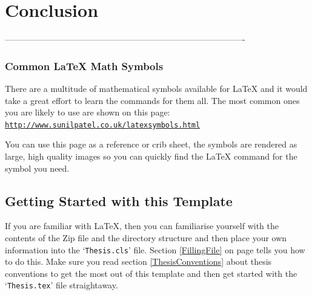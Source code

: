 
\chapter{Conclusion} %

\label{Chapter4} %



-------------------------------------------------------------------------------------




\subsection{Common \LaTeX{} Math Symbols}
There are a multitude of mathematical symbols available for \LaTeX{} and it would take a great effort to learn the commands for them all. The most common ones you are likely to use are shown on this page:\\
\href{http://www.sunilpatel.co.uk/latexsymbols.html}{\texttt{http://www.sunilpatel.co.uk/latexsymbols.html}}

You can use this page as a reference or crib sheet, the symbols are rendered as large, high quality images so you can quickly find the \LaTeX{} command for the symbol you need.




\section{Getting Started with this Template}

If you are familiar with \LaTeX{}, then you can familiarise yourself with the contents of the Zip file and the directory structure and then place your own information into the `\texttt{Thesis.cls}' file. Section \ref{FillingFile} on page \pageref{FillingFile} tells you how to do this. Make sure you read section \ref{ThesisConventions} about thesis conventions to get the most out of this template and then get started with the `\texttt{Thesis.tex}' file straightaway.


